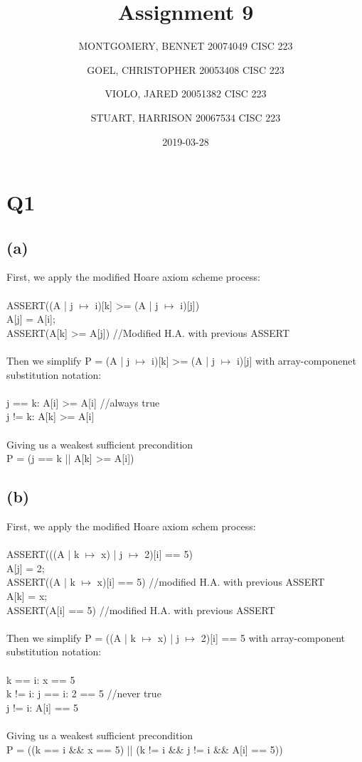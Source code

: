 \documentclass{article}
\title{Assignment 9}
\date{2019-03-28}
\author{MONTGOMERY, BENNET 20074049 CISC 223\\
		\and GOEL, CHRISTOPHER 20053408 CISC 223\\
		\and VIOLO, JARED 20051382 CISC 223\\
		\and STUART, HARRISON 20067534 CISC 223
		}
\begin{document}
	\maketitle
	
	\section*{Q1}
	\subsection*{(a)}
	First, we apply the modified Hoare axiom scheme process:\\\\
		{\selectfont
ASSERT((A | j $\mapsto$ i)[k] >= (A | j $\mapsto$ i)[j])\\
A[j] = A[i];\\
ASSERT(A[k] >= A[j]) //Modified H.A. with previous ASSERT\\\\
	}
	Then we simplify {\selectfont P = (A | j $\mapsto$ i)[k] >= (A | j $\mapsto$ i)[j]} with array-componenet substitution notation:\\\\
	{\selectfont
		j == k: A[i] >= A[i] //always true\\
		j != k: A[k] >= A[i]\\\\
	}
	Giving us a weakest sufficient precondition\\ {\selectfont P = (j == k || A[k] >= A[i])}
	\subsection*{(b)}
	First, we apply the modified Hoare axiom schem process:\\\\
	{\selectfont
ASSERT(((A | k $\mapsto$ x) | j $\mapsto$ 2)[i] == 5)\\
A[j] = 2;\\
ASSERT((A | k $\mapsto$ x)[i] == 5) //modified H.A. with previous ASSERT\\ 
A[k] = x;\\
ASSERT(A[i] == 5) //modified H.A. with previous ASSERT\\\\
	}
	Then we simplify {\selectfont P = ((A | k $\mapsto$ x) | j $\mapsto$ 2)[i] == 5 } with array-component substitution notation:\\\\
	{\selectfont
		k == i: x == 5\\
		k != i: j == i: 2 == 5 //never true\\
		\hphantom{aaaaaaaa} j != i: A[i] == 5\\\\
	}
	Giving us a weakest sufficient precondition\\
	{\selectfont
		P = ((k == i \&\& x == 5) || (k != i \&\& j != i \&\& A[i] == 5))
	}
	
\end{document}
